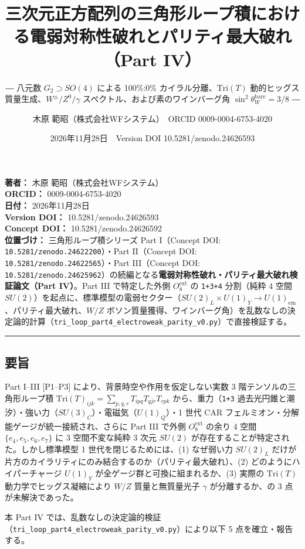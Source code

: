 \documentclass[
  a4paper,
]{ltjsarticle}
\title{三次元正方配列の三角形ループ積における電弱対称性破れとパリティ最大破れ（Part
IV）}
\subtitle{― 八元数 \(G_2 \supset SO(4)\) による 100\%:0\%
カイラル分離、\(\mathrm{Tri}(T)\)
動的ヒッグス質量生成、\(W^\pm/Z^0/\gamma\)
スペクトル、および素のワインバーグ角
\(\sin^2\theta_W^{\mathrm{bare}} = 3/8\) ―}
\author{木原 範昭（株式会社WFシステム）　ORCID 0009-0004-6753-4020}
\date{2026年11月28日　Version DOI 10.5281/zenodo.24626593}
\begin{document}
\maketitle

{
\setcounter{tocdepth}{2}
\tableofcontents
}
\textbf{著者：} 木原 範昭（株式会社WFシステム）\\
\textbf{ORCID：} 0009-0004-6753-4020\\
\textbf{日付：} 2026年11月28日\\
\textbf{Version DOI：} 10.5281/zenodo.24626593\\
\textbf{Concept DOI：} 10.5281/zenodo.24626592\\
\textbf{位置づけ：} 三角形ループ積シリーズ Part I（Concept DOI:
\texttt{10.5281/zenodo.24622200}）・Part II（Concept DOI:
\texttt{10.5281/zenodo.24622565}）・Part III（Concept DOI:
\texttt{10.5281/zenodo.24625962}）の続編となる\textbf{電弱対称性破れ・パリティ最大破れ検証論文（Part
IV）}。Part III で特定した外側 \(O_8^{\mathrm{ext}}\) の \texttt{1+3+4}
分割（純粋 4 空間
\(SU(2)\)）を起点に、標準模型の電弱セクター（\(SU(2)_L \times U(1)_Y \to U(1)_{\mathrm{em}}\)、パリティ最大破れ、\(W/Z\)
ボソン質量獲得、ワインバーグ角）を乱数なしの決定論的計算（\texttt{tri\_loop\_part4\_electroweak\_parity\_v0.py}）で直接検証する。

\begin{center}\rule{0.5\linewidth}{0.5pt}\end{center}

\subsection{要旨}\label{ux8981ux65e8}

Part I--III {[}P1--P3{]} により、背景時空や作用を仮定しない実数 3
階テンソルの三角形ループ積
\(\mathrm{Tri}(T)_{ijk} = \sum_{p,q,r} T_{ipq} T_{qjr} T_{rpk}\)
から、重力（\texttt{1+3}
過去光円錐と潮汐）・強い力（\(SU(3)_C\)）・電磁気（\(U(1)_Q\)）・1 世代
CAR フェルミオン・分解能ゲージが統一接続され、さらに Part III で外側
\(O_8^{\mathrm{ext}}\) の余り 4 空間 \(\{e_4,e_5,e_6,e_7\}\) に 3
空間不変な純粋 3 次元 \(SU(2)\)
が存在することが特定された。しかし標準模型 1 世代を閉じるためには、(1)
なぜ弱い力 \(SU(2)_L\)
だけが片方のカイラリティにのみ結合するのか（パリティ最大破れ）、(2)
どのようにハイパーチャージ \(U(1)_Y\)
が全ゲージ群と可換に組まれるか、(3) 実際の \(\mathrm{Tri}(T)\)
動力学でヒッグス凝縮により \(W/Z\) 質量と無質量光子 \(\gamma\)
が分離するか、の 3 点が未解決であった。

本 Part IV
では、乱数なしの決定論的検証（\texttt{tri\_loop\_part4\_electroweak\_parity\_v0.py}）により以下
5 点を確立・報告する。
\end{document}
